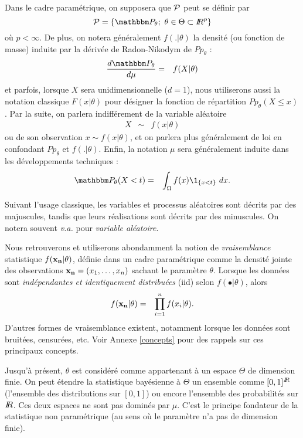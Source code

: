 Dans le cadre paramétrique, on supposera que ${\cal{P}}$ peut se définir par
$$
{\cal{P}}=\left\{\Pp_{\theta}; \ \theta\in\Theta\subset\R^p\right\}
$$
où $p<\infty$. De plus, on notera généralement $f(.|\theta)$ la densité (ou fonction de masse) induite par la dérivée de Radon-Nikodym de $Pp_{\theta}$ :
\begin{eqnarray*}
\frac{d \Pp_{\theta}}{d\mu} & = & f(X|\theta) %
\end{eqnarray*}
et parfois, lorsque $X$ sera unidimensionnelle ($d=1$), nous utiliserons aussi la notation classique $F(x|\theta)$ pour désigner la fonction de répartition $Pp_{\theta}(X\leq x)$. 
Par la suite, on parlera indifférement de la variable aléatoire
\begin{eqnarray*}
X & \sim & f(x|\theta)
\end{eqnarray*}
ou de son observation $x\sim f(x|\theta)$, et on parlera plus généralement de {loi} en confondant $Pp_{\theta}$ et $f(.|\theta)$. Enfin, la notation $\mu$ sera généralement induite dans les développements techniques :
\begin{eqnarray*}
\Pp_{\theta}(X<t) & = & \int_{\Omega} f(x) \1_{\{x<t\}} \ dx.
\end{eqnarray*}

\begin{remark}
Suivant l'usage classique, les variables et processus aléatoires sont décrits par des majuscules, tandis que leurs réalisations sont décrits par des minuscules. On notera souvent {\it v.a.} pour {\it variable aléatoire}.
\end{remark}

Nous retrouverons et utiliserons abondamment  la notion de \emph{vraisemblance} statistique $f({\bf x_n}|\theta)$, définie dans un cadre paramétrique comme la densité jointe des observations ${\bf x_n}=(x_1,\ldots,x_n)$ sachant le paramètre $\theta$. Lorsque les données sont \emph{indépendantes et identiquement distribuées} (iid) selon $f(•|\theta)$, alors
\begin{eqnarray*}
f({\bf x_n}|\theta) & = & \prod\limits_{i=1}^n f(x_i|\theta).
\end{eqnarray*}
D'autres formes de vraisemblance existent, notamment lorsque les données sont bruitées, censurées, etc. Voir Annexe \ref{concepts} pour des rappels  sur ces principaux concepts. \\

\begin{remark}
Jusqu'à présent, $\theta$ est considéré comme appartenant à un espace $\Theta$ de dimension finie. On peut étendre la statistique bayésienne à $\Theta$ un ensemble comme $[0,1]^{I\!\!R}$ (l'ensemble des distributions sur $[0,1]$) ou encore l'ensemble des probabilités sur $I\!\!R$. Ces deux espaces ne sont pas dominés par $\mu$. C'est le principe fondateur de la statistique non paramétrique (au sens où le paramètre n'a pas de dimension finie). 
\end{remark}


